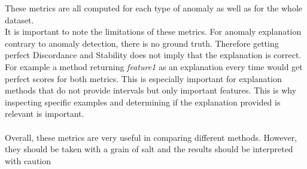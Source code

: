 \documentclass[oneside, a4paper, onecolumn, 11pt]{article}
\begin{document}
These metrics are all computed for each type of anomaly as well as for the whole dataset.\\
It is important to note the limitations of these metrics. For anomaly explanation contrary to anomaly detection, there is no ground truth. Therefore getting perfect Discordance and Stability does not imply that the explanation is correct. For example a method returning \textit{feature1} as an explanation every time would get perfect scores for both metrics. This is especially important for explanation methods that do not provide intervals but only important features. This is why inspecting specific examples and determining if the explanation provided is relevant is important.\\\\
Overall, these metrics are very useful in comparing different methods. However, they should be taken with a grain of salt and the results should be interpreted with caution\\  
\end{document}
